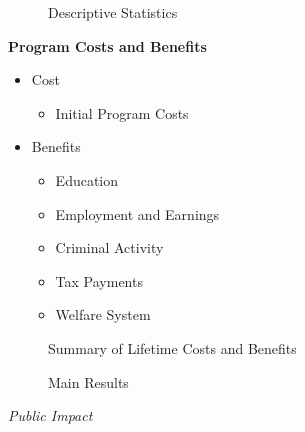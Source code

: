 \begin{frame}\begin{figure}\caption{Descriptive Statistics}
\end{figure}\end{frame}
\begin{frame}\textbf{Program Costs and Benefits}
\begin{itemize}
\item Cost
\begin{itemize}
\item Initial Program Costs
\end{itemize}
\item Benefits
\begin{itemize}
\item Education
\item Employment and Earnings
\item Criminal Activity
\item Tax Payments
\item Welfare System
\end{itemize}
\end{itemize}
\end{frame}
\begin{frame}\begin{figure}\caption{Summary of Lifetime Costs and Benefits}
\end{figure}\end{frame}
\begin{frame}\begin{figure}\caption{Main Results}
\end{figure}\end{frame}
\begin{frame}\begin{center}
\LARGE\textit{Public Impact}
\end{center}\end{frame}
